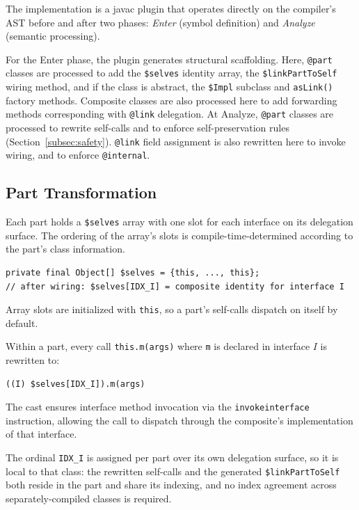 \documentclass[acmsmall,screen,review,anonymous]{acmart}
\theoremstyle{acmplain}
\newcommand{\code}[1]{\texttt{#1}}
\begin{document}
The implementation is a javac plugin that operates directly on the compiler's AST before and after two phases: \emph{Enter}
(symbol definition) and \emph{Analyze} (semantic processing).

For the Enter phase, the plugin generates structural scaffolding. Here, \code{@part} classes are processed to add
the \code{\$selves} identity array, the \code{\$linkPartToSelf} wiring method, and if the class is abstract, the \code{\$Impl}
subclass and \code{asLink()} factory methods. Composite classes are also processed here to add forwarding methods corresponding
with \code{@link} delegation. At Analyze, \code{@part} classes are processed to rewrite self-calls and to enforce self-preservation
rules (Section~\ref{subsec:safety}). \code{@link} field assignment is also rewritten here to invoke wiring, and to enforce \code{@internal}.

\subsection{Part Transformation}

Each part holds a \code{\$selves} array with one slot for each interface on its delegation surface. The ordering of the
array's slots is compile-time-determined according to the part's class information.

\begin{lstlisting}[language={},style=java]
private final Object[] $selves = {this, ..., this};
// after wiring: $selves[IDX_I] = composite identity for interface I
\end{lstlisting}

Array slots are initialized with \code{this}, so a part's self-calls dispatch on itself by default.

Within a part, every call \code{this.m(args)} where \code{m} is declared in interface $I$ is rewritten to:

\begin{lstlisting}
((I) $selves[IDX_I]).m(args)
\end{lstlisting}

The cast ensures interface method invocation via the \code{invokeinterface} instruction, allowing the call to dispatch through
the composite's implementation of that interface.

The ordinal \code{IDX\_I} is assigned per part over its own delegation surface, so it is local to that class: the rewritten
self-calls and the generated \code{\$linkPartToSelf} both reside in the part and share its indexing, and no index agreement
across separately-compiled classes is required.
\end{document}
